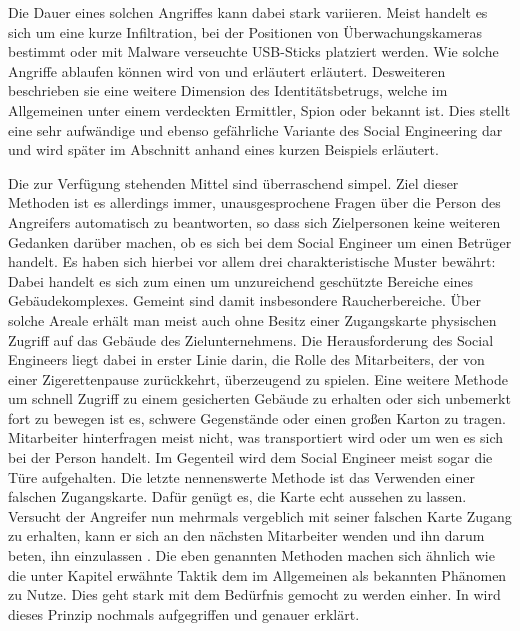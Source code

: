 Die Dauer eines solchen Angriffes kann dabei stark variieren.
Meist handelt es sich um eine kurze Infiltration, bei der Positionen von Überwachungskameras bestimmt oder mit Malware verseuchte USB-Sticks  platziert werden.
Wie solche Angriffe ablaufen können wird von  \citep{hadnagy} und \citep{hacking-the-human} erläutert erläutert.
Desweiteren beschrieben sie eine weitere Dimension des Identitätsbetrugs, welche im Allgemeinen unter einem verdeckten Ermittler, Spion oder  bekannt ist.
Dies stellt eine sehr aufwändige und ebenso gefährliche Variante des Social Engineering dar und wird später im Abschnitt  anhand eines kurzen Beispiels erläutert.

Die zur Verfügung stehenden Mittel sind überraschend simpel.
Ziel dieser Methoden ist es allerdings immer, unausgesprochene Fragen über die Person des Angreifers automatisch zu beantworten, so dass sich Zielpersonen keine weiteren Gedanken darüber machen, ob es sich bei dem Social Engineer um einen Betrüger handelt.
Es haben sich hierbei vor allem drei charakteristische Muster bewährt:
Dabei handelt es sich zum einen um unzureichend geschützte Bereiche eines Gebäudekomplexes.
Gemeint sind damit insbesondere Raucherbereiche.
Über solche Areale erhält man meist auch ohne Besitz einer Zugangskarte physischen Zugriff auf das Gebäude des Zielunternehmens.
Die Herausforderung des Social Engineers liegt dabei in erster Linie darin, die Rolle des Mitarbeiters, der von einer Zigerettenpause zurückkehrt, überzeugend zu spielen.
Eine weitere Methode um schnell Zugriff zu einem gesicherten Gebäude zu erhalten oder sich unbemerkt fort zu bewegen ist es, schwere Gegenstände oder einen großen Karton zu tragen.
Mitarbeiter hinterfragen meist nicht, was transportiert wird oder um wen es sich bei der Person handelt. Im Gegenteil wird dem Social Engineer meist sogar die Türe aufgehalten.
Die letzte nennenswerte Methode ist das Verwenden einer falschen Zugangskarte.
Dafür genügt es, die Karte echt aussehen zu lassen.
Versucht der Angreifer nun mehrmals vergeblich mit seiner falschen Karte Zugang zu erhalten, kann er sich an den nächsten Mitarbeiter wenden und ihn darum beten, ihn einzulassen \citep{hadnagy}.
Die eben genannten Methoden machen sich ähnlich wie die unter Kapitel  erwähnte Taktik dem im Allgemeinen als  bekannten Phänomen zu Nutze.
Dies geht stark mit dem Bedürfnis gemocht zu werden einher.
In  wird dieses Prinzip nochmals aufgegriffen und genauer erklärt.

